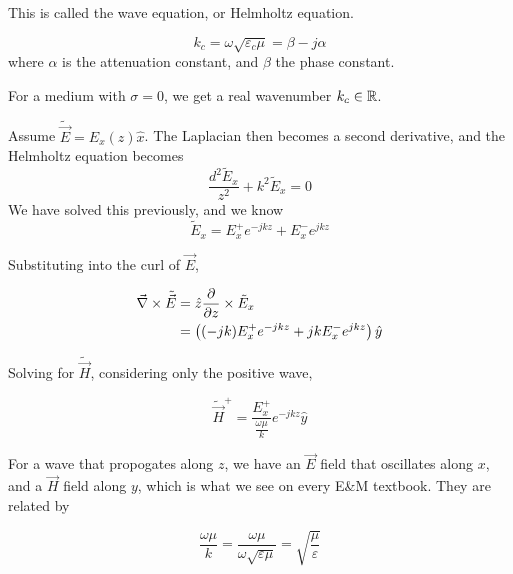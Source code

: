 \documentclass[12pt]{article}
\begin{document}
This is called the wave equation, or Helmholtz equation.

\begin{defn}
    $$k_c = \omega\sqrt{\varepsilon_c\mu} = \beta - j\alpha$$
    where $\alpha$ is the attenuation constant, and $\beta$ the phase constant.
\end{defn}

For a medium with $\sigma = 0$, we get a real wavenumber $k_c \in \mathbb{R}$.

 Assume $\tilde{\vec E} = E_x(z)\hat x$. The Laplacian then becomes a second derivative, and the Helmholtz equation becomes
 $$\frac{d^2\tilde E_x}{z^2} + k^2\tilde E_x = 0$$
 We have solved this previously, and we know
 $$\tilde E_x = E_x^+e^{-jkz} + E_x^-e^{jkz}$$

 Substituting into the curl of $\vec E$,

 \begin{align*}
     \vec\nabla \times \tilde{\vec E} &= \hat z\frac{\partial }{\partial z} \times \tilde E_x \\
                                      &= \left((-jk)E_x^+e^{-jkz} + jkE_x^-e^{jkz}\right)\hat y
 \end{align*}

 Solving for $\tilde{\vec H}$, considering only the positive wave,

 $$\tilde{\vec H}^+ = \frac{E_x^+}{\frac{\omega\mu}{k}}e^{-jkz}\hat y$$

 For a wave that propogates along $z$, we have an $\vec E$ field that oscillates along $x$, and a $\vec H$ field along $y$, which is what we see on every E\&M textbook. They are related by

 \begin{defn}
     $$\frac{\omega\mu}{k} = \frac{\omega\mu}{\omega\sqrt{\varepsilon\mu}} = \sqrt{\frac{\mu}{\varepsilon}}$$
 \end{defn}
\end{document}
